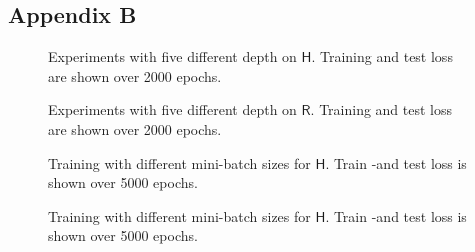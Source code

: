 \documentclass[12pt, a4paper]{article}
\newcommand{\hy}{\(\textsf{H}\)}
\newcommand{\rare}{\(\textsf{R}\)}
\begin{document}
\subsection{Appendix B}\label{Sec:AppendixA}
\begin{center}
	\begin{figure}[htbp!]
		\scalebox{.9}{}
		\scalebox{.9}{}
		\scalebox{.9}{}
		\scalebox{.9}{}
		\scalebox{.9}{}
		\caption{Experiments with five different depth on \hy. Training and test loss are shown over 2000 epochs.}
		\label{Fig:Depth Hydro}
	\end{figure}
\end{center}
\begin{center}
	\begin{figure}[htbp!]
		\scalebox{.9}{}
		\scalebox{.9}{}
		\scalebox{.9}{}
		\scalebox{.9}{}
		\scalebox{.9}{}
		\caption{Experiments with five different depth on \rare. Training and test loss are shown over 2000 epochs.}
		\label{Fig:Depth Rare}
	\end{figure}
\end{center}
\begin{center}
	\begin{figure}[htbp!]
		\scalebox{.9}{}
		\scalebox{.9}{}
		\scalebox{.9}{}
		\scalebox{.9}{}
		\scalebox{.9}{}
		\scalebox{.9}{}
		\caption{Training with different mini-batch sizes for \hy. Train -and test loss is shown over 5000 epochs.}
		\label{Fig:Batch Hy}
	\end{figure}
\end{center}
\begin{center}
	\begin{figure}[htbp!]\ContinuedFloat
		\scalebox{.9}{}
		\scalebox{.9}{}
		\caption{Training with different mini-batch sizes for \hy. Train -and test loss is shown over 5000 epochs.}
		\label{}
	\end{figure}
\end{center}
\end{document}
